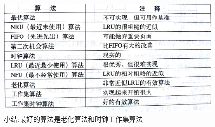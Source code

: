 \documentclass[UTF8,a4paper]{ctexart}
\begin{document}
\begin{figure}[H]
	\centering
	\includegraphics[scale = 0.1]{assets/ModernOperatingSystems_22227.png}
	\caption{小结:最好的算法是老化算法和时钟工作集算法}
\end{figure}
\end{document}
